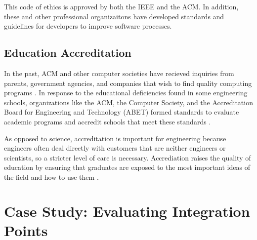 This code of ethics is approved by both the IEEE and the ACM. In addition, these
and other professional organizaitons  have developed standards and guidelines
for developers to improve software processes.


\subsection{Education Accreditation}

In the past, ACM and other computer societies have recieved inquiries from
parents, government agencies, and companies that wish to find quality computing
programs \cite{Mulder84}. In response to the educational deficiencies found in
some engineering schools, organizations like the ACM, the Computer Society, and
the Accreditation Board for Engineering and Technology (ABET) formed standards
to evaluate academic programs and accredit schools that meet these standards
\cite{ABET,Mulder84}.

As opposed to science, accreditation is important for engineering because
engineers often deal directly with customers that are neither engineers or
scientists, so a stricter level of care is necessary. Accrediation raises the
quality of education by ensuring that graduates are exposed to the most
important ideas of the field and how to use them \cite{Parnas98}.

\section{Case Study: Evaluating Integration Points}

